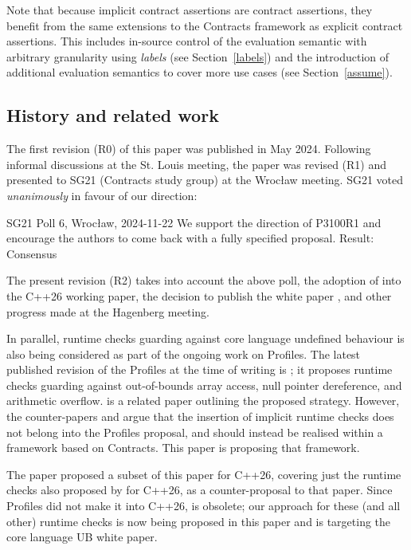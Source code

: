 Note that because implicit contract assertions are contract assertions, they benefit from the same extensions to the Contracts framework as explicit contract assertions. This includes in-source control of the evaluation semantic with arbitrary granularity using \emph{labels} (see Section~\ref{labels}) and the introduction of additional evaluation semantics to cover more use cases (see Section~\ref{assume}).

\subsection{History and related work}

The first revision (R0) of this paper was published in May 2024. Following informal discussions at the St. Louis meeting, the paper was revised (R1) and presented to SG21 (Contracts study group) at the Wroc{\l}aw meeting. SG21 voted \emph{unanimously} in favour of our direction:
\vspace{1mm}
\begin{wgpoll}{{SG21 Poll 6, Wroc{\l}aw, 2024-11-22}}
We support the direction of P3100R1 and encourage the authors to come back with a fully specified proposal.
Result: Consensus
\end{wgpoll}

The present revision (R2) takes into account the above poll, the adoption of \cite{P2900R14} into the C++26 working paper, the decision to publish the white paper \cite{P3656R0}, and other progress made at the Hagenberg meeting.

In parallel, runtime checks guarding against core language undefined behaviour is also being considered as part of the ongoing work on Profiles. The latest published revision of the Profiles at the time of writing is \cite{P3081R2}; it proposes runtime checks guarding against out-of-bounds array access, null pointer dereference, and arithmetic overflow. \cite{P3436R1} is a related paper outlining the proposed strategy. However, the counter-papers \cite{P3543R0} and \cite{P3558R1} argue that the insertion of implicit runtime checks does not belong into the Profiles proposal, and should instead be realised within a framework based on Contracts. This paper is proposing that framework.

The paper \cite{P3599R0} proposed a subset of this paper for C++26, covering just the runtime checks also proposed by \cite{P3081R2} for C++26, as a counter-proposal to that paper. Since Profiles did not make it into C++26, \cite{P3229R0} is obsolete; our approach for these (and all other) runtime checks is now being proposed in this paper and is targeting the core language UB white paper.

